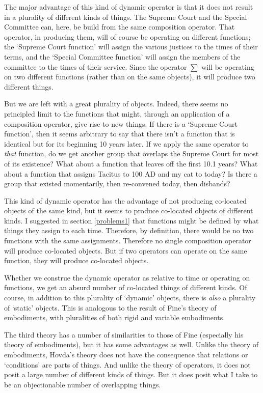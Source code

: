 \documentclass[11pt]{article}
\begin{document}
\begin{spacing}{1.5}
The major advantage of this kind of dynamic operator is that it does
not result in a plurality of different kinds of things.  The Supreme
Court and the Special Committee can, here, be build from the same
composition operator.  That operator, in producing them, will of
course be operating on different functions; the `Supreme Court
function' will assign the various justices to the times of their
terms, and the `Special Committee function' will assign the members of
the committee to the times of their service.  Since the operator
$\sum$ will be operating on two different functions (rather than on
the same objects), it will produce two different things.


But we are left with a great plurality of objects.  Indeed, there
seems no principled limit to the functions that might, through an
application of a composition operator, give rise to new things.  If
there is a `Supreme Court function', then it seems arbitrary to say
that there isn't a function that is identical but for its beginning 10
years later.  If we apply the same operator to {\em that} function, do
we get another group that overlaps the Supreme Court for most of its
existence?  What about a function that leaves off the first 10.1
years?  What about a function that assigns Tacitus to 100 AD and my
cat to today?  Is there a group that existed momentarily, then
re-convened today, then disbands?

This kind of dynamic operator has the advantage of not producing
co-located objects of the same kind, but it seems to produce
co-located objects of different kinds.  I suggested in section
\ref{problems1} that functions might be defined by what things they
assign to each time.  Therefore, by definition, there would be no two
functions with the same assignments.  Therefore no single composition
operator will produce co-located objects.  But if two operators can
operate on the same function, they will produce co-located objects.

Whether we construe the dynamic operator as relative to time or
operating on functions, we get an absurd number of co-located things
of different kinds.  Of course, in addition to this plurality of
`dynamic' objects, there is {\em also} a plurality of `static'
objects.  This is analogous to the result of Fine's theory of
embodiments, with pluralities of both rigid and variable embodiments.

The third theory has a number of similarities to those of Fine
(especially his theory of embodiments), but it has some advantages as
well.  Unlike the theory of embodiments, Hovda's theory does not have
the consequence that relations or `conditions' are parts of things.
And unlike the theory of operators, it does not posit a large number
of different kinds of things.  But it does posit what I take to be an
objectionable number of overlapping things.


\end{spacing}
\end{document}
